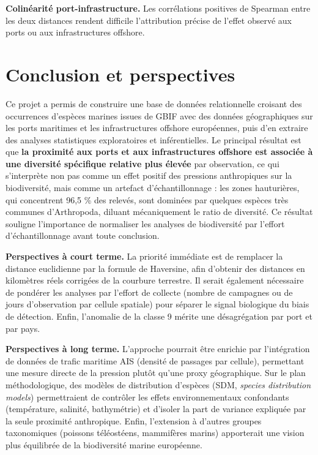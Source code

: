 \documentclass[mstat,12pt]{unswthesis}
\begin{document}
\textbf{Colinéarité port-infrastructure.} Les corrélations positives de
Spearman entre les deux distances rendent difficile l'attribution
précise de l'effet observé aux ports ou aux infrastructures offshore.

\chapter{Conclusion et perspectives}\label{conclusion-et-perspectives}

Ce projet a permis de construire une base de données relationnelle
croisant des occurrences d'espèces marines issues de GBIF avec des
données géographiques sur les ports maritimes et les infrastructures
offshore européennes, puis d'en extraire des analyses statistiques
exploratoires et inférentielles. Le principal résultat est que
\textbf{la proximité aux ports et aux infrastructures offshore est
associée à une diversité spécifique relative plus élevée} par
observation, ce qui s'interprète non pas comme un effet positif des
pressions anthropiques sur la biodiversité, mais comme un artefact
d'échantillonnage : les zones hauturières, qui concentrent 96,5 \% des
relevés, sont dominées par quelques espèces très communes d'Arthropoda,
diluant mécaniquement le ratio de diversité. Ce résultat souligne
l'importance de normaliser les analyses de biodiversité par l'effort
d'échantillonnage avant toute conclusion.

\textbf{Perspectives à court terme.} La priorité immédiate est de
remplacer la distance euclidienne par la formule de Haversine, afin
d'obtenir des distances en kilomètres réels corrigées de la courbure
terrestre. Il serait également nécessaire de pondérer les analyses par
l'effort de collecte (nombre de campagnes ou de jours d'observation par
cellule spatiale) pour séparer le signal biologique du biais de
détection. Enfin, l'anomalie de la classe 9 mérite une désagrégation par
port et par pays.

\textbf{Perspectives à long terme.} L'approche pourrait être enrichie
par l'intégration de données de trafic maritime AIS (densité de passages
par cellule), permettant une mesure directe de la pression plutôt qu'une
proxy géographique. Sur le plan méthodologique, des modèles de
distribution d'espèces (SDM, \emph{species distribution models})
permettraient de contrôler les effets environnementaux confondants
(température, salinité, bathymétrie) et d'isoler la part de variance
expliquée par la seule proximité anthropique. Enfin, l'extension à
d'autres groupes taxonomiques (poissons téléostéens, mammifères marins)
apporterait une vision plus équilibrée de la biodiversité marine
européenne.
\end{document}
